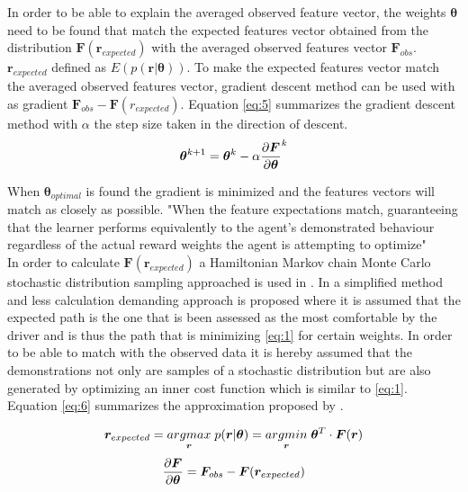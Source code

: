 In order to be able to explain the averaged observed feature vector, the weights $\bm{\theta}$ need to be found that match the expected features vector obtained from the distribution $\bm{F}(\bm{r}_{expected})$ with the averaged observed features vector $\bm{F}_{obs}$. $\bm{r}_{expected}$ defined as $ E(p(\bm{r}|\bm{\theta}))$. To make the expected features vector match the averaged observed features vector, gradient descent method can be used with as gradient $\bm{F}_{obs} - \bm{F}(r_{expected})$. Equation \ref{eq:5} summarizes the gradient descent method with $\alpha$ the step size taken in the direction of descent.
\begin{equation}\label{eq:5}
	\bm{\theta}^{k+1} = \bm{\theta}^{k} - \alpha \pdv{\bm{F}}{\bm{\theta}}^k 
\end{equation}

When $\bm{\theta}_{optimal}$ is found the gradient is minimized and the features vectors will match as closely as possible. "When the feature expectations match, guaranteeing that the learner performs equivalently to the agent's demonstrated behaviour regardless of the actual reward weights the
agent is attempting to optimize" \cite{Abbeel2004}\\

In order to calculate $\bm{F}(\bm{r}_{expected})$ a Hamiltonian Markov chain
Monte Carlo stochastic distribution sampling approached is used in \cite{Kretzschmar2014}. In \cite{Kuderer2015a} a simplified method and less calculation demanding approach is proposed where it is assumed that the expected path is the one that is been assessed as the most comfortable by the driver and is thus the path that is minimizing \ref{eq:1} for certain weights. In order to be able to match with the observed data it is hereby assumed that the demonstrations not only are samples of a stochastic distribution but are also generated by optimizing an inner cost function which is similar to \ref{eq:1}. Equation \ref{eq:6} summarizes the approximation proposed by \cite{Kuderer2015a}.
\newcommand{\argmax}{argmax}
\newcommand{\argmin}{argmin}

\begin{equation}\label{eq:6}
	\bm{r}_{expected} = \underset{\bm{r}}{\argmax} \hspace{1mm} p(\bm{r}|\bm{\theta}) = \underset{\bm{r}}{\argmin} \hspace{1mm}  \bm{\theta}^T\cdot \bm{F}(\bm{r})
\end{equation}
\begin{equation}\label{eq:new}
	\pdv{\bm{F}}{\bm{\theta}} = \bm{F}_{obs} - \bm{F}(\bm{r}_{expected})
\end{equation}


